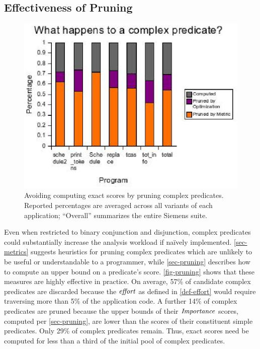 \subsection{Effectiveness of Pruning}

\begin{figure}
  \centering
  \includegraphics{charts/pruning}
  \caption{Avoiding computing exact scores by pruning complex predicates.  Reported percentages are averaged across all variants of each application; ``Overall'' summarizes the entire Siemens suite.}
  \label{fig-pruning}
\end{figure}

Even when restricted to binary conjunction and disjunction, complex predicates could substantially increase the analysis workload if na\"ively implemented.  \autoref{sec-metrics} suggests heuristics for pruning complex predicates which are unlikely to be useful or understandable to a programmer, while \autoref{sec-pruning} describes how to compute an upper bound on a predicate's score.  \autoref{fig-pruning} shows that these measures are highly effective in practice.  On average, 57\% of candidate complex predicates are discarded because the $\mathit{effort}$ as defined in \autoref{def-effort} would require traversing more than 5\% of the application code.  A further 14\% of complex predicates are pruned because the upper bounds of their $\mathit{Importance}$ scores, computed per \autoref{sec-pruning}, are lower than the scores of their constituent simple predicates.  Only 29\% of complex predicates remain.  Thus, exact scores need be computed for less than a third of the initial pool of complex predicates.

